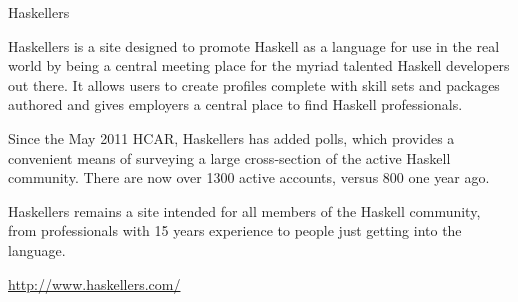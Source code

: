 \begin{hcarentry}[section]{Haskellers}
\label{haskellers}
\makeheader

Haskellers is a site designed to promote Haskell as a language for use in the real world by being a central meeting place for the myriad talented Haskell developers out there. It allows users to create profiles complete with skill sets and packages authored and gives employers a central place to find Haskell professionals.

Since the May 2011 HCAR, Haskellers has added polls, which provides a convenient means of surveying a large cross-section of the active Haskell community. There are now over 1300 active accounts, versus 800 one year ago.

Haskellers remains a site intended for all members of the Haskell community, from professionals with 15 years experience to people just getting into the language.

\FurtherReading
\url{http://www.haskellers.com/}
\end{hcarentry}
